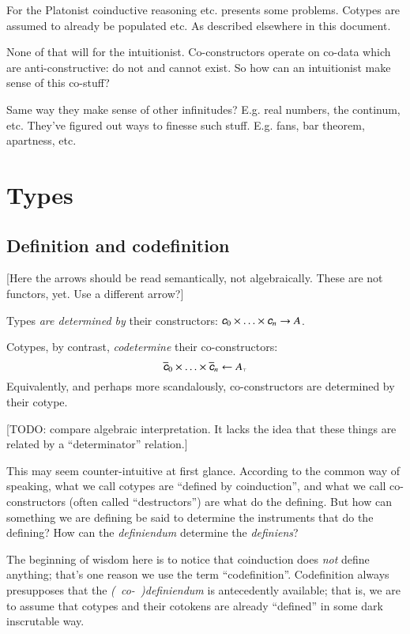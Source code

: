 For the Platonist coinductive reasoning etc. presents some problems.
Cotypes are assumed to already be populated etc.  As described elsewhere in this document.

None of that will for the intuitionist. Co-constructors operate on
co-data which are anti-constructive: do not and cannot exist. So how
can an intuitionist make sense of this co-stuff?

Same way they make sense of other infinitudes? E.g. real numbers, the
continum, etc. They've figured out ways to finesse such stuff. E.g.
fans, bar theorem, apartness, etc.

\section{Types}

\subsection{Definition and codefinition}



[Here the arrows should be read semantically, not algebraically. These
  are not functors, yet. Use a different arrow?]

Types \textit{are determined by} their constructors: \(\ctor{0}\times\ldots\times\ctor{n} \rightarrow A\).

Cotypes, by contrast, \textit{codetermine} their co-constructors:
\[\coctor{0}\times\ldots\times\coctor{n} \leftarrow \cotype{A}\]
Equivalently, and perhaps more scandalously, co-constructors are
determined by their cotype.

[TODO: compare algebraic interpretation. It lacks the idea that these
  things are related by a ``determinator'' relation.]

This may seem counter-intuitive at first glance. According to the
common way of speaking, what we call cotypes are ``defined by
coinduction'', and what we call co-constructors (often called
``destructors'') are what do the defining. But how can something we
are defining be said to determine the instruments that do the
defining? How can the \textit{definiendum} determine the
\textit{definiens}?

The beginning of wisdom here is to notice that coinduction does
\textit{not} define anything; that's one reason we use the term
``codefinition''. Codefinition always presupposes that the
\textit{(~co-~)definiendum} is antecedently available; that is, we are
to assume that cotypes and their cotokens are already ``defined'' in
some dark inscrutable way.

